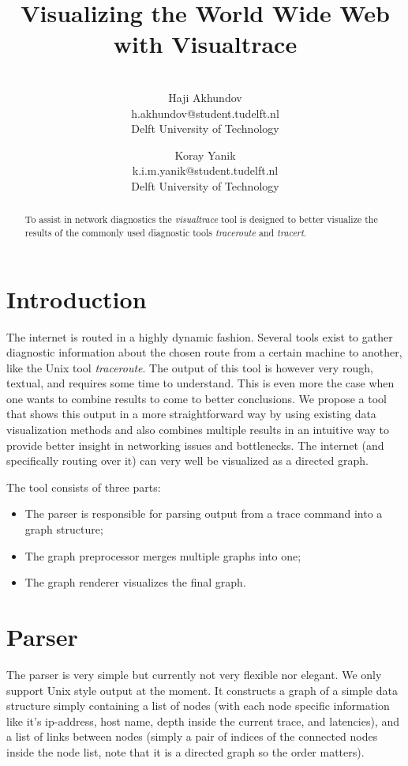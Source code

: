 \documentclass[a4paper,10pt]{article}
\title{Visualizing the World Wide Web with Visualtrace}
\author{\\Haji Akhundov\\h.akhundov@student.tudelft.nl\\ Delft University of Technology \and Koray Yanik\\k.i.m.yanik@student.tudelft.nl\\ Delft University of Technology}
\begin{document}
\maketitle

\begin{abstract}
To assist in network diagnostics the \emph{visualtrace} tool is designed to better visualize the results of the commonly used diagnostic tools \emph{traceroute} and \emph{tracert}.
\end{abstract}

\section{Introduction}
The internet is routed in a highly dynamic fashion. Several tools exist to gather diagnostic information about the chosen route from a certain machine to another, like the Unix tool \emph{traceroute}. The output of this tool is however very rough, textual, and requires some time to understand. This is even more the case when one wants to combine results to come to better conclusions. We propose a tool that shows this output in a more straightforward way by using existing data visualization methods and also combines multiple results in an intuitive way to provide better insight in networking issues and bottlenecks. The internet (and specifically routing over it) can very well be visualized as a directed graph.

The tool consists of three parts:
\begin{itemize}
\item The parser is responsible for parsing output from a trace command into a graph structure;
\item The graph preprocessor merges multiple graphs into one;
\item The graph renderer visualizes the final graph.
\end{itemize}

\section{Parser}
The parser is very simple but currently not very flexible nor elegant. We only support Unix style output at the moment. It constructs a graph of a simple data structure simply containing a list of nodes (with each node specific information like it's ip-address, host name, depth inside the current trace, and latencies), and a list of links between nodes (simply a pair of indices of the connected nodes inside the node list, note that it is a directed graph so the order matters).
\end{document}
